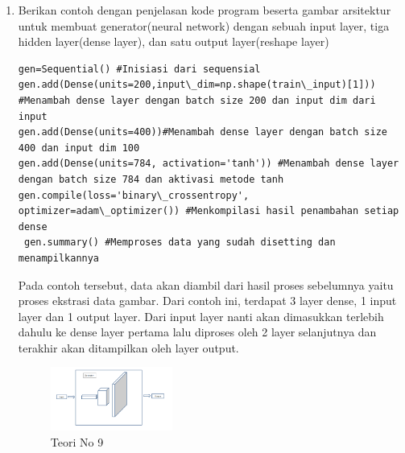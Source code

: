 \begin{enumerate}
            \item Berikan contoh dengan penjelasan kode program beserta gambar arsitektur untuk membuat generator(neural network) dengan sebuah input layer, tiga hidden layer(dense layer), dan satu output layer(reshape layer)
\begin{verbatim}
gen=Sequential() #Inisiasi dari sequensial
gen.add(Dense(units=200,input\_dim=np.shape(train\_input)[1])) #Menambah dense layer dengan batch size 200 dan input dim dari input
gen.add(Dense(units=400))#Menambah dense layer dengan batch size 400 dan input dim 100
gen.add(Dense(units=784, activation='tanh')) #Menambah dense layer dengan batch size 784 dan aktivasi metode tanh
gen.compile(loss='binary\_crossentropy', optimizer=adam\_optimizer()) #Menkompilasi hasil penambahan setiap dense
 gen.summary() #Memproses data yang sudah disetting dan menampilkannya
\end{verbatim}    
            \par Pada contoh tersebut, data akan diambil dari hasil proses sebelumnya yaitu proses ekstrasi data gambar. Dari contoh ini, terdapat 3 layer dense, 1 input layer dan 1 output layer. Dari input layer nanti akan dimasukkan terlebih dahulu ke dense layer pertama lalu diproses oleh 2 layer selanjutnya dan terakhir akan ditampilkan oleh layer output.
            \begin{figure}[H]
                \includegraphics[width=4cm]{figures/1174086/chapter8/teori9.png}
                \centering
                  \caption{Teori No 9}
            \end{figure}


\end{enumerate}
